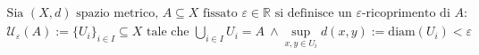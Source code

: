 \documentclass[preview]{standalone}
\begin{document}
\begin{align*}
\text{Sia } (X, d) \text{ spazio metrico, } A \subseteq X \text{ fissato } \varepsilon \in \mathbb{R} \text{ si definisce un } \varepsilon\text{-ricoprimento di } A: \\ \mathcal{U}_{\varepsilon}(A) := \{U_i\}_{i \in I} \subseteq X \text{ tale che } \bigcup_{i \in I} U_i = A \ \land \sup_{x,y \in U_i} d(x,y) := \text{diam}(U_i) < \varepsilon
\end{align*}
\end{document}
